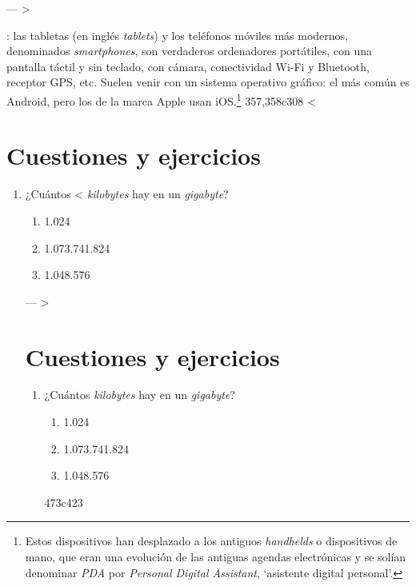 ---
> \item[Tabletas y \emph{smartphones}]: las tabletas (en inglés \emph{tablets}) y los teléfonos móviles más modernos, denominados \emph{smartphones}, son verdaderos ordenadores portátiles, con una pantalla táctil y sin teclado, con cámara, conectividad Wi-Fi y Bluetooth, receptor GPS, etc. Suelen venir con un sistema operativo gráfico: el más común es Android, pero los de la marca Apple usan iOS.\footnote{Estos dispositivos han desplazado a los antiguos \emph{handhelds} o dispositivos de mano, que eran una evolución de las antiguas agendas electrónicas y se solían denominar \emph{PDA} por \emph{Personal Digital Assistant}, `asistente digital personal'.} 
357,358c308
< \section{Cuestiones y ejercicios} \begin{enumerate} \item ¿Cuántos
<   \emph{kilobytes} hay en un \emph{gigabyte}? \begin{enumerate} \item 1.024 \item 1.073.741.824 \item 1.048.576 \end{enumerate} 
---
> \section{Cuestiones y ejercicios} \begin{enumerate} \item ¿Cuántos \emph{kilobytes} hay en un \emph{gigabyte}? \begin{enumerate} \item 1.024 \item 1.073.741.824 \item 1.048.576 \end{enumerate} 
473c423

\end{enumerate}
\end{enumerate}
